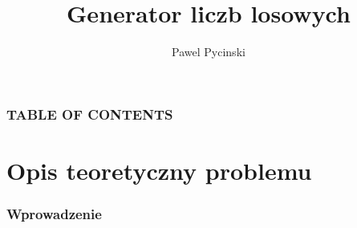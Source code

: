 \documentclass[9pt]{beamer}
\title{Generator liczb losowych}
\author{Pawel Pycinski}
\institute{Uniwesytet Jagielloński}
\begin{document}
\titlepage

\begin{frame}

 \frametitle{TABLE OF CONTENTS}
 \tableofcontents
\end{frame}
\section{Opis teoretyczny problemu}
\begin{frame}
  \frametitle{Wprowadzenie}
  
\end{frame}
    
\end{document}
